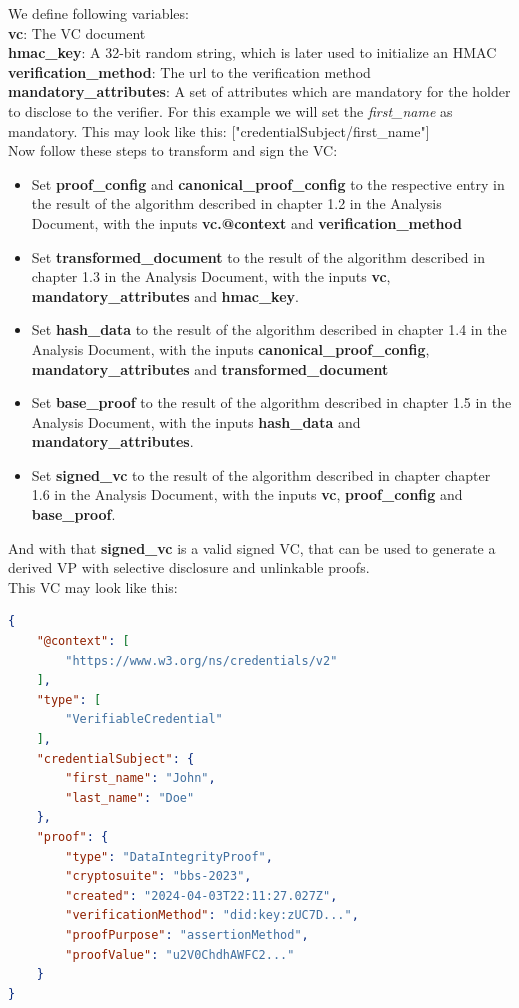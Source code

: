 \documentclass[
	a4paper               %
	,bibliography=totoc   %
	,listof=totoc         %
	,monolingual
	twoside=false,
]{bfhthesis}              %
\begin{document}
We define following variables:\\
\textbf{vc}: The VC document\\
\textbf{hmac\_key}: A 32-bit random string, which is later used to initialize an HMAC\\
\textbf{verification\_method}: The url to the verification method\\
\textbf{mandatory\_attributes}: A set of attributes which are mandatory for the holder to disclose to the verifier. For this example we will set the \textit{first\_name} as mandatory. This may look like this: ["credentialSubject/first\_name"]\\

Now follow these steps to transform and sign the VC:
\begin{itemize}
	\item Set \textbf{proof\_config} and \textbf{canonical\_proof\_config} to the respective entry in the result of the algorithm described in chapter 1.2 in the Analysis Document, with the inputs \textbf{vc.@context} and \textbf{verification\_method}
	\item Set \textbf{transformed\_document} to the result of the algorithm described in chapter 1.3 in the Analysis Document, with the inputs \textbf{vc}, \textbf{mandatory\_attributes} and \textbf{hmac\_key}.
	\item Set \textbf{hash\_data} to the result of the algorithm described in chapter 1.4 in the Analysis Document, with the inputs \textbf{canonical\_proof\_config}, \textbf{mandatory\_attributes} and \textbf{transformed\_document}
	\item Set \textbf{base\_proof} to the result of the algorithm described in chapter 1.5 in the Analysis Document, with the inputs \textbf{hash\_data} and \textbf{mandatory\_attributes}.
	\item Set \textbf{signed\_vc} to the result of the algorithm described in chapter chapter 1.6 in the Analysis Document, with the inputs \textbf{vc}, \textbf{proof\_config} and \textbf{base\_proof}.
\end{itemize}

And with that \textbf{signed\_vc} is a valid signed VC, that can be used to generate a derived VP with selective disclosure and unlinkable proofs.\\

This VC may look like this:

\begin{lstlisting}[language=json,firstnumber=1,caption={Signed VC},captionpos=b]
{
	"@context": [
		"https://www.w3.org/ns/credentials/v2"
	],
	"type": [
		"VerifiableCredential"
	],
	"credentialSubject": {
		"first_name": "John",
		"last_name": "Doe"
	},
	"proof": {
		"type": "DataIntegrityProof",
		"cryptosuite": "bbs-2023",
		"created": "2024-04-03T22:11:27.027Z",
		"verificationMethod": "did:key:zUC7D...",
		"proofPurpose": "assertionMethod",
		"proofValue": "u2V0ChdhAWFC2..."
	}
}
\end{lstlisting}
\end{document}
